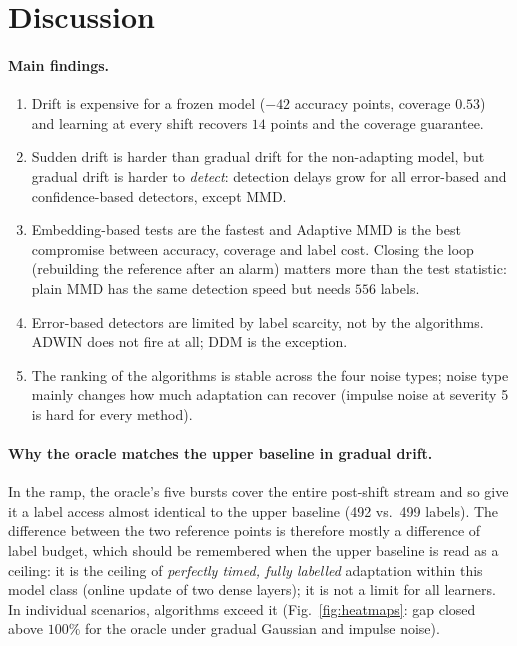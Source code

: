 \documentclass[11pt,a4paper]{article}
\begin{document}
\section{Discussion}
\label{sec:discussion}

\paragraph{Main findings.}
\begin{enumerate}[nosep]
 \item Drift is expensive for a frozen model ($-42$ accuracy points, coverage $0.53$) and learning at every shift recovers $14$ points and the coverage guarantee.
 \item Sudden drift is harder than gradual drift for the non-adapting model, but gradual drift is harder to \emph{detect}: detection delays grow for all error-based and confidence-based detectors, except MMD.
 \item Embedding-based tests are the fastest and Adaptive MMD is the best compromise between accuracy, coverage and label cost. Closing the loop (rebuilding the reference after an alarm) matters more than the test statistic: plain MMD has the same detection speed but needs $556$ labels.
 \item Error-based detectors are limited by label scarcity, not by the algorithms. ADWIN does not fire at all; DDM is the exception.
 \item The ranking of the algorithms is stable across the four noise types; noise type mainly changes how much adaptation can recover (impulse noise at severity 5 is hard for every method).
\end{enumerate}

\paragraph{Why the oracle matches the upper baseline in gradual drift.}
In the ramp, the oracle's five bursts cover the entire post-shift stream and so give it a label access almost identical to the upper baseline (492 vs.\ 499 labels).
The difference between the two reference points is therefore mostly a difference of label budget, which should be remembered when the upper baseline is read as a ceiling: it is the ceiling of \emph{perfectly timed, fully labelled} adaptation within this model class (online update of two dense layers); it is not a limit for all learners.
In individual scenarios, algorithms exceed it (Fig.~\ref{fig:heatmaps}: gap closed above $100\%$ for the oracle under gradual Gaussian and impulse noise).
\end{document}
